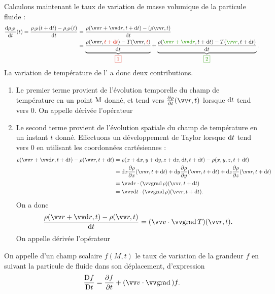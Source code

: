 \documentclass[12pt,fancy]{cours}
\begin{document}
Calculons maintenant le taux de variation de masse volumique de la particule fluide :
\begin{align}
  \dd{\rho_{\Pf}}{t}(t) = 
\dfrac{\rho_{\Pf}(t+\d t)-\rho_{\Pf}(t)}{\d t} & = \dfrac{\rho(\Vec{r}+\Vec{\d r},t+\d t) -(\rho\Vec{r},t)}{\d t} \\ & = \underbrace{\dfrac{\rho(\Vec{r},\JRouge{t+\d t})-T(\Vec{r},\JRouge{t})}{\d t}}_{\JRouge{\fbox{1}}} + \underbrace{\dfrac{\rho(\JVert{\Vec{r}+\Vec{\d r}},t+\d t)-T(\JVert{\Vec{r}},t+\d t)}{\d t}}_{\JVert{\fbox{2}}}.
\label{eq:varia_T}
\end{align}
La variation de température de l' a donc deux contributions.
\begin{enumerate}
\item Le premier terme provient de l'évolution temporelle du champ de température en un point $\rm M$ donné, et tend vers $\dr{\rho}{t}(\Vec{r},t)$ lorsque $\mathrm{d} t$ tend vers $0$. On appelle dérivée  l'opérateur 
\item Le second terme provient de l'évolution spatiale du champ de température en un instant $t$ donné. Effectuons un développement de Taylor lorsque $\mathrm{d} t$ tend vers $0$ en utilisant les coordonnées cartésiennes  :
\begin{align*}
\rho(\Vec{r}+\Vec{\d r},t+\d t) - \rho(\Vec{r},t+\d t) & =\rho(x +\d x, y + \d y,z + \d z, \d t,t+\d t) - \rho(x,y,z,t+\d t) \\
& = \d x \dr{\rho}{x}(\Vec{r},t+\d t) + \d y \dr{\rho}{y}(\Vec{r},t+\d t) + \d z \dr{\rho}{z}(\Vec{r},t+\d t) \\ & = \Vec{\d r} \cdot (\Grad{\rho})(\Vec{r},t+\d t) \\
& =  \Vec{v} \d t \cdot (\Grad{\rho})(\Vec{r},t+\d t).
\end{align*}
On a donc 
\begin{equation}
\dfrac{\rho(\Vec{r}+\Vec{\d r},t ) -\rho(\Vec{r},t)}{\d t} = (\Vec{v} \cdot \Grad{T})(\Vec{r},t).
\end{equation}
On appelle dérivée  l'opérateur 
\end{enumerate}

\begin{definition}\label{def:D_part}
On appelle  d'un champ scalaire $f(M,t)$ le taux de variation de la grandeur $f$ en suivant la particule de fluide dans son déplacement, d'expression
\begin{equation*}
\Dt{f} = \dr{f}{t} + (\Vec{v} \cdot \grad){f}.
\end{equation*}
\end{definition}
\end{document}

